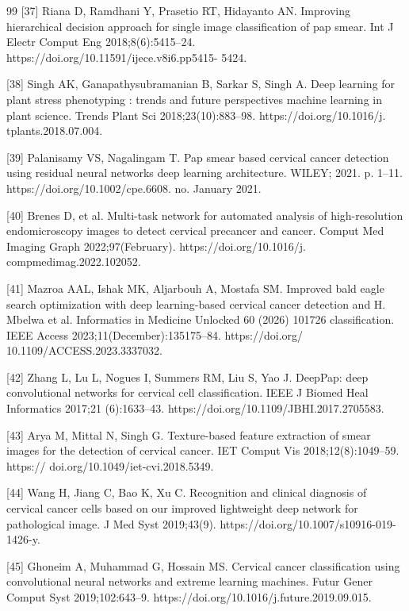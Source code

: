 \documentclass[final,5p,times,twocolumn,authoryear]{elsarticle}
\begin{document}
\begin{thebibliography}{99}
 [37] Riana D, Ramdhani Y, Prasetio RT, Hidayanto AN. Improving hierarchical decision approach for single image classification of pap smear. Int J Electr Comput Eng 2018;8(6):5415–24. https://doi.org/10.11591/ijece.v8i6.pp5415- 5424.

 [38] Singh AK, Ganapathysubramanian B, Sarkar S, Singh A. Deep learning for plant stress phenotyping : trends and future perspectives machine learning in plant science. Trends Plant Sci 2018;23(10):883–98. https://doi.org/10.1016/j. tplants.2018.07.004.

 [39] Palanisamy VS, Nagalingam T. Pap smear based cervical cancer detection using residual neural networks deep learning architecture. WILEY; 2021. p. 1–11. https://doi.org/10.1002/cpe.6608. no. January 2021.

 [40] Brenes D, et al. Multi-task network for automated analysis of high-resolution endomicroscopy images to detect cervical precancer and cancer. Comput Med Imaging Graph 2022;97(February). https://doi.org/10.1016/j. compmedimag.2022.102052.

 [41] Mazroa AAL, Ishak MK, Aljarbouh A, Mostafa SM. Improved bald eagle search optimization with deep learning-based cervical cancer detection and
H. Mbelwa et al. Informatics in Medicine Unlocked 60 (2026) 101726 classification. IEEE Access 2023;11(December):135175–84. https://doi.org/ 10.1109/ACCESS.2023.3337032.

 [42] Zhang L, Lu L, Nogues I, Summers RM, Liu S, Yao J. DeepPap: deep convolutional networks for cervical cell classification. IEEE J Biomed Heal Informatics 2017;21 (6):1633–43. https://doi.org/10.1109/JBHI.2017.2705583.

 [43] Arya M, Mittal N, Singh G. Texture-based feature extraction of smear images for the detection of cervical cancer. IET Comput Vis 2018;12(8):1049–59. https:// doi.org/10.1049/iet-cvi.2018.5349.

 [44] Wang H, Jiang C, Bao K, Xu C. Recognition and clinical diagnosis of cervical cancer cells based on our improved lightweight deep network for pathological image. J Med Syst 2019;43(9). https://doi.org/10.1007/s10916-019-1426-y.

 [45] Ghoneim A, Muhammad G, Hossain MS. Cervical cancer classification using convolutional neural networks and extreme learning machines. Futur Gener Comput Syst 2019;102:643–9. https://doi.org/10.1016/j.future.2019.09.015.


\end{thebibliography}
\end{document}
